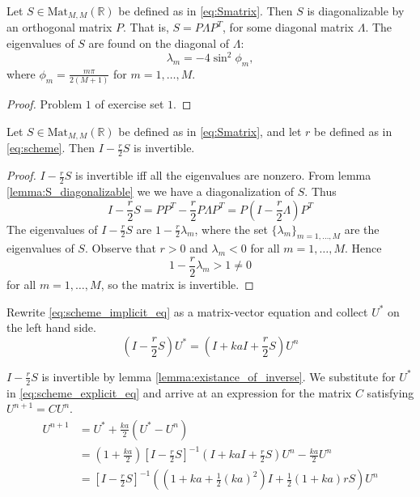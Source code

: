 \begin{lemma}
  \label{lemma:S_diagonalizable}
  Let \( S \in \text{Mat}_{M,M}(\mathbb{R}) \) be defined as in \eqref{eq:Smatrix}.
  Then \( S \) is diagonalizable by an orthogonal matrix \( P \).
  That is, \( S = P \Lambda P^T \), for some diagonal matrix \( \Lambda \).
  The eigenvalues of \( S \) are found on the diagonal of \( \Lambda \):
  \[
    \lambda_m = - 4 \sin^2 \phi_m,
  \]
  where \( \phi_m = \frac{m \pi}{2(M+1)} \) for \(m = 1, \dots, M. \)
\end{lemma}
\begin{proof}
    Problem \( 1 \) of exercise set \( 1 \).
\end{proof}

\begin{lemma}
  \label{lemma:existance_of_inverse}
Let \( S \in \text{Mat}_{M,M}(\mathbb{R}) \) be defined as in \eqref{eq:Smatrix},
and let \( r \) be defined as in \eqref{eq:scheme}.
  Then \( I - \frac{r}{2} S\) is invertible.
\end{lemma}
\begin{proof}
  \( I - \frac{r}{2} S \) is invertible iff all the eigenvalues are nonzero.
  From lemma \ref{lemma:S_diagonalizable} we we have a diagonalization of \( S \). Thus
  \begin{equation*}
      I - \frac{r}{2} S
      = PP^T - \frac{r}{2} P\Lambda P^T
      = P \left(I - \frac{r}{2} \Lambda \right) P^T
  \end{equation*}
  The eigenvalues of \( I - \frac{r}{2}S \) are
  \( 1 - \frac{r}{2} \lambda_m\),
  where the set \( \{\lambda_m\}_{m=1,\dots,M} \) are the eigenvalues of \( S \).
  Observe that \( r > 0 \) and \( \lambda_m < 0 \) for all \( m = 1, \dots, M \).
  Hence
  \[
    1 - \frac{r}{2} \lambda_m > 1 \neq 0
  \]
  for all \( m = 1, \dots, M \), so the matrix is invertible.
\end{proof}

Rewrite \eqref{eq:scheme_implicit_eq} as a matrix-vector equation
and collect \( U^* \) on the left hand side.
\begin{equation}
  \left(I - \frac{r}{2}S\right)U^* = \left(I + kaI + \frac{r}{2}S\right) U^n
\end{equation}

\( I - \frac{r}{2}S \) is invertible
by lemma \ref{lemma:existance_of_inverse}.
We substitute for \( U^* \)
in \eqref{eq:scheme_explicit_eq}
and arrive at an expression for the matrix \( C \)
satisfying \( U^{n+1} = C U^n \).
\begin{align*}
  U^{n+1} &= U^* + \frac{ka}{2}\left(U^*  - U^n\right) \\
          &= \left(1 + \frac{ka}{2}\right) {\left[I - \frac{r}{2}S\right]}^{-1} \left(I + kaI + \frac{r}{2}S\right) U^n - \frac{ka}{2}U^n \\
          &= {\left[I - \frac{r}{2}S\right]}^{-1} \left( \left(1+ka+\frac{1}{2}(ka)^2\right)I + \frac{1}{2}\left(1+ka\right)rS\right) U^n
\end{align*}

